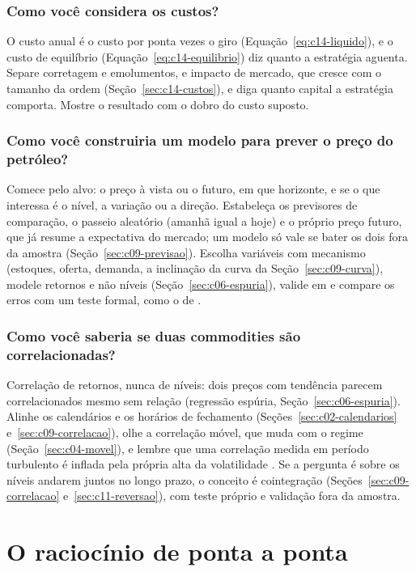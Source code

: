 \subsubsection{Como você considera os custos?}
O custo anual é o custo por ponta vezes o giro (Equação~\eqref{eq:c14-liquido}), e o custo de equilíbrio (Equação~\eqref{eq:c14-equilibrio}) diz quanto a estratégia aguenta. Separe corretagem e emolumentos,  e impacto de mercado, que cresce com o tamanho da ordem (Seção~\ref{sec:c14-custos}), e diga quanto capital a estratégia comporta. Mostre o resultado com o dobro do custo suposto.

\subsubsection{Como você construiria um modelo para prever o preço do petróleo?}
Comece pelo alvo: o preço à vista ou o futuro, em que horizonte, e se o que interessa é o nível, a variação ou a direção. Estabeleça os previsores de comparação, o passeio aleatório (amanhã igual a hoje) e o próprio preço futuro, que já resume a expectativa do mercado; um modelo só vale se bater os dois fora da amostra (Seção~\ref{sec:c09-previsao}). Escolha variáveis com mecanismo (estoques, oferta, demanda, a inclinação da curva da Seção~\ref{sec:c09-curva}), modele retornos e não níveis (Seção~\ref{sec:c06-espuria}), valide em  e compare os erros com um teste formal, como o de \citet{diebold1995}.

\subsubsection{Como você saberia se duas commodities são correlacionadas?}
Correlação de retornos, nunca de níveis: dois preços com tendência parecem correlacionados mesmo sem relação (regressão espúria, Seção~\ref{sec:c06-espuria}). Alinhe os calendários e os horários de fechamento (Seções~\ref{sec:c02-calendarios} e~\ref{sec:c09-correlacao}), olhe a correlação móvel, que muda com o regime (Seção~\ref{sec:c04-movel}), e lembre que uma correlação medida em período turbulento é inflada pela própria alta da volatilidade \citep{forbes2002}. Se a pergunta é sobre os níveis andarem juntos no longo prazo, o conceito é cointegração (Seções~\ref{sec:c09-correlacao} e~\ref{sec:c11-reversao}), com teste próprio e validação fora da amostra.

\section{O raciocínio de ponta a ponta}
\label{sec:c16-ponta-a-ponta}

